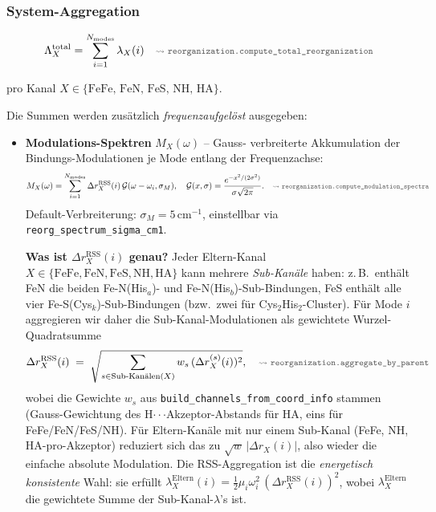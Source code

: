 \documentclass[11pt,a4paper,twoside]{article}
\newcommand{\codref}[1]{%
  \quad\text{\textcolor{gray!70!black}{\footnotesize $\rightsquigarrow$~\texttt{#1}}}}
\theoremstyle{remark}
\begin{document}
\subsubsection*{System-Aggregation}

\begin{equation}
  \Lambda_X^\text{total} = \sum_{i=1}^{N_\text{modes}} \lambda_X(i)
  \codref{reorganization.compute\_total\_reorganization}
  \label{eq:lambda-total}
\end{equation}

pro Kanal $X \in \{\text{FeFe, FeN, FeS, NH, HA}\}$.

Die Summen werden zus\"atzlich \emph{frequenzaufgel\"ost} ausgegeben:

\begin{itemize}
  \item \textbf{Modulations-Spektren} $M_X(\omega)$ -- Gauss-
        verbreiterte Akkumulation der Bindungs-Modulationen je Mode
        entlang der Frequenzachse:
        \begin{equation}
          M_X(\omega)
          = \sum_{i=1}^{N_\text{modes}}
            \Delta r_X^\text{RSS}(i)\,
            \mathcal{G}(\omega - \omega_i, \sigma_M),
          \quad
          \mathcal{G}(x,\sigma) = \frac{e^{-x^2/(2\sigma^2)}}{\sigma\sqrt{2\pi}}.
          \codref{reorganization.compute\_modulation\_spectra}
          \label{eq:M-spectrum}
        \end{equation}
        Default-Verbreiterung: $\sigma_M = 5$\,cm$^{-1}$, einstellbar
        via \texttt{reorg\_spectrum\_sigma\_cm1}.

        \medskip
        \noindent\textbf{Was ist $\Delta r_X^\text{RSS}(i)$ genau?}
        Jeder Eltern-Kanal
        $X \in \{\text{FeFe}, \text{FeN}, \text{FeS}, \text{NH}, \text{HA}\}$
        kann mehrere \emph{Sub-Kan\"ale} haben: z.\,B.\ enth\"alt FeN
        die beiden Fe-N(His$_a$)- und Fe-N(His$_b$)-Sub-Bindungen, FeS
        enth\"alt alle vier Fe-S(Cys$_k$)-Sub-Bindungen (bzw.\ zwei
        f\"ur Cys$_2$His$_2$-Cluster). F\"ur Mode $i$ aggregieren wir
        daher die Sub-Kanal-Modulationen als gewichtete
        Wurzel-Quadratsumme
        \begin{equation}
          \Delta r_X^\text{RSS}(i)
            \;=\; \sqrt{\sum_{s \in \text{Sub-Kan\"alen}(X)}
                          w_s\,(\Delta r_X^{(s)}(i))^2},
          \codref{reorganization.aggregate\_by\_parent}
          \label{eq:dr-rss}
        \end{equation}
        wobei die Gewichte $w_s$ aus
        \texttt{build\_channels\_from\_coord\_info} stammen
        (Gauss-Gewichtung des H$\cdot\cdot\cdot$Akzeptor-Abstands
        f\"ur HA, eins f\"ur FeFe/FeN/FeS/NH). F\"ur Eltern-Kan\"ale
        mit nur einem Sub-Kanal (FeFe, NH, HA-pro-Akzeptor) reduziert
        sich das zu $\sqrt{w}\,|\Delta r_X(i)|$, also wieder die
        einfache absolute Modulation. Die RSS-Aggregation ist die
        \emph{energetisch konsistente} Wahl: sie erf\"ullt
        $\lambda_X^\text{Eltern}(i) = \tfrac{1}{2}\mu_i\omega_i^2
        \,(\Delta r_X^\text{RSS}(i))^2$, wobei
        $\lambda_X^\text{Eltern}$ die gewichtete Summe der
        Sub-Kanal-$\lambda$'s ist.


\end{itemize}
\end{document}
